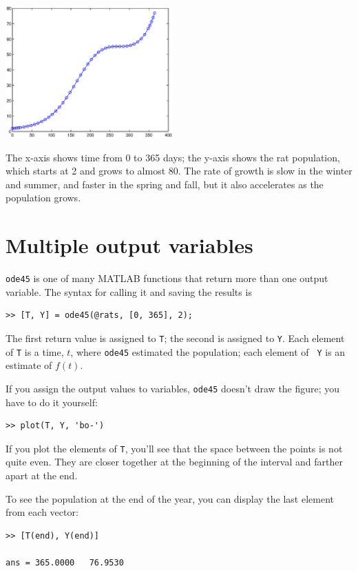 \documentclass{book}
\begin{document}
\beforefig \centerline{\includegraphics[height=2in]{figs/rats.eps}}

The x-axis shows time from 0 to 365 days; the y-axis shows the rat
population, which starts at 2 and grows to almost 80.  The rate
of growth is slow in the winter and summer, and faster in the
spring and fall, but it also accelerates as the population grows.


\section{Multiple output variables}
\label{rats}

{\tt ode45} is one of many MATLAB functions that return more
than one output variable.  The syntax for calling it and saving
the results is

\begin{verbatim}
>> [T, Y] = ode45(@rats, [0, 365], 2);
\end{verbatim}

The first return value is assigned to {\tt T}; the second is assigned
to {\tt Y}.  Each element of {\tt T} is a time,
$t$, where {\tt ode45} estimated the population; each element of {\tt
Y} is an estimate of $f(t)$.

If you assign the output values to variables,
{\tt ode45} doesn't draw the figure;
you have to do it yourself:

\begin{verbatim}
>> plot(T, Y, 'bo-')
\end{verbatim}

If you plot the elements of {\tt T}, you'll see that the
space between the points is not quite even.  They are closer
together at the beginning of the interval and farther apart at the end.

To see the population at the end of the year, you can display the
last element from each vector:

\begin{verbatim}
>> [T(end), Y(end)]

ans = 365.0000   76.9530
\end{verbatim}
\end{document}
